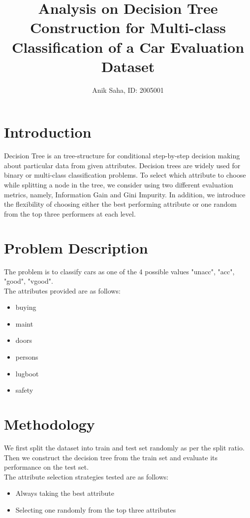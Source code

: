 \documentclass[12pt]{article}
\begin{document}
\title{Analysis on Decision Tree Construction for Multi-class Classification of a Car Evaluation Dataset}
\author{Anik Saha, ID: 2005001}
\maketitle
\newpage

\section{Introduction}

Decision Tree is an tree-structure for conditional step-by-step decision making about particular data from given attributes. Decision trees are widely used for binary or multi-class classification problems. To select which attribute to choose while splitting a node in the tree, we consider using two different evaluation metrics, namely, Information Gain and Gini Impurity. In addition, we introduce the flexibility of choosing either the best performing attribute or one random from the top three performers at each level.

\section{Problem Description}

The problem is to classify cars as one of the 4 possible values "unacc", "acc", "good", "vgood".\\

The attributes provided are as follows:
\begin{itemize}
    \item buying
    \item maint
    \item doors
    \item persons
    \item lugboot
    \item safety
\end{itemize}

\section{Methodology}

We first split the dataset into train and test set randomly as per the split ratio. Then we construct the decision tree from the train set and evaluate its performance on the test set.\\

The attribute selection strategies tested are as follows:
\begin{itemize}
    \item Always taking the best attribute
    \item Selecting one randomly from the top three attributes
\end{itemize}
\end{document}
